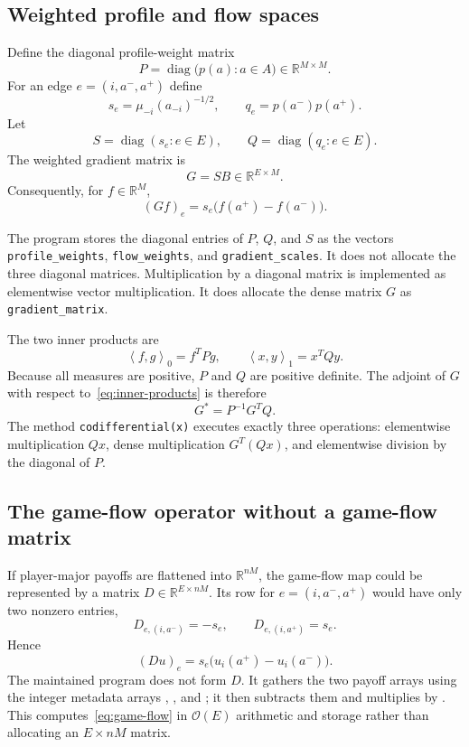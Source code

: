 \documentclass[11pt]{article}
\newcommand{\R}{\mathbb{R}}
\newcommand{\diag}{\operatorname{diag}}
\newcommand{\cO}{\mathcal{O}}
\newcommand{\ip}[2]{\left\langle #1,#2\right\rangle}
\begin{document}
\subsection{Weighted profile and flow spaces}

Define the diagonal profile-weight matrix
\[
 P=\diag\bigl(p(a):a\in A\bigr)\in\R^{M\times M}.
\]
For an edge $e=(i,a^-,a^+)$ define
\[
 s_e=\mu_{-i}(a_{-i})^{-1/2},\qquad
 q_e=p(a^-)p(a^+).
\]
Let
\[
 S=\diag(s_e:e\in E),\qquad Q=\diag(q_e:e\in E).
\]
The weighted gradient matrix is
\begin{equation}
 G=SB\in\R^{E\times M}.
 \label{eq:gradient-matrix}
\end{equation}
Consequently, for $f\in\R^M$,
\[
 (Gf)_e=s_e\bigl(f(a^+)-f(a^-)\bigr).
\]

The program stores the diagonal entries of $P$, $Q$, and $S$ as the vectors
\texttt{profile\_weights}, \texttt{flow\_weights}, and
\texttt{gradient\_scales}.  It does not allocate the three diagonal matrices.
Multiplication by a diagonal matrix is implemented as elementwise vector
multiplication.  It does allocate the dense matrix $G$ as
\texttt{gradient\_matrix}.

The two inner products are
\begin{equation}
 \ip{f}{g}_0=f^TPg,
 \qquad
 \ip{x}{y}_1=x^TQy.
 \label{eq:inner-products}
\end{equation}
Because all measures are positive, $P$ and $Q$ are positive definite.  The
adjoint of $G$ with respect to~\eqref{eq:inner-products} is therefore
\begin{equation}
 G^*=P^{-1}G^TQ.
 \label{eq:codifferential}
\end{equation}
The method \texttt{codifferential(x)} executes exactly three operations:
elementwise multiplication $Qx$, dense multiplication $G^T(Qx)$, and
elementwise division by the diagonal of $P$.

\subsection{The game-flow operator without a game-flow matrix}

If player-major payoffs are flattened into $\R^{nM}$, the game-flow map could
be represented by a matrix $D\in\R^{E\times nM}$.  Its row for
$e=(i,a^-,a^+)$ would have only two nonzero entries,
\[
D_{e,(i,a^-)}=-s_e,\qquad D_{e,(i,a^+)}=s_e.
\]
Hence
\begin{equation}
 (Du)_e=s_e\bigl(u_i(a^+)-u_i(a^-)\bigr).
 \label{eq:game-flow}
\end{equation}
The maintained program does not form $D$.  It gathers the two payoff arrays
using the integer metadata arrays , , and
; it then subtracts them and multiplies by
.  This computes~\eqref{eq:game-flow} in
$\cO(E)$ arithmetic and storage rather than allocating an $E\times nM$
matrix.
\end{document}
